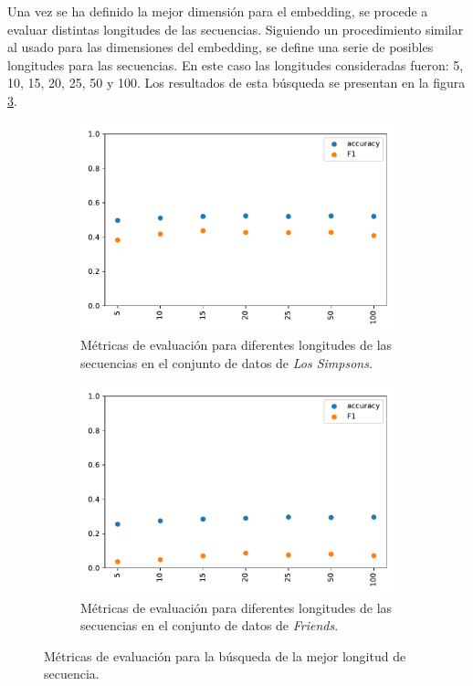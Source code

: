 Una vez se ha definido la mejor dimensión para el embedding, se procede a evaluar distintas longitudes de las secuencias. Siguiendo un procedimiento similar al usado para las dimensiones del embedding, se define una serie de posibles longitudes para las secuencias. En este caso las longitudes consideradas fueron: 5, 10, 15, 20, 25, 50 y 100. Los resultados de esta búsqueda se presentan en la figura \ref{fig:em_seq_len}.


\begin{figure}
    \centering
    \begin{subfigure}[b]{0.45\textwidth}
        \centering
        \includegraphics[width=\textwidth]{doc/images/seq_len/simpsons.pdf}
        \caption{Métricas de evaluación para diferentes longitudes de las secuencias en el conjunto de datos de \textit{Los Simpsons}.}
        \label{fig:em_seq_len_simpsons}
    \end{subfigure}
    \hfill
    \begin{subfigure}[b]{0.45\textwidth}
        \centering
        \includegraphics[width=\textwidth]{doc/images/seq_len/friends.pdf}
        \caption{Métricas de evaluación para diferentes longitudes de las secuencias en el conjunto de datos de \textit{Friends}.}
        \label{fig:em_seq_len_friends}
    \end{subfigure}
    \caption{Métricas de evaluación para la búsqueda de la mejor longitud de secuencia.}
    \label{fig:em_seq_len}
\end{figure}


